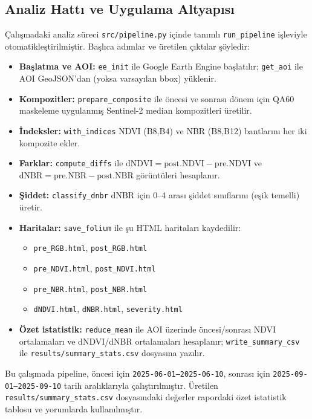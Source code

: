 \documentclass[11pt,a4paper]{article}
\begin{document}
\subsection{Analiz Hattı ve Uygulama Altyapısı}
Çalışmadaki analiz süreci \texttt{src/pipeline.py} içinde tanımlı \texttt{run\_pipeline} işleviyle otomatikleştirilmiştir. Başlıca adımlar ve üretilen çıktılar şöyledir:
\begin{itemize}
  \item \textbf{Başlatma ve AOI:} \texttt{ee\_init} ile Google Earth Engine başlatılır; \texttt{get\_aoi} ile AOI GeoJSON'dan (yoksa varsayılan bbox) yüklenir.
  \item \textbf{Kompozitler:} \texttt{prepare\_composite} ile öncesi ve sonrası dönem için QA60 maskeleme uygulanmış Sentinel-2 median kompozitleri üretilir.
  \item \textbf{İndeksler:} \texttt{with\_indices} NDVI (B8,B4) ve NBR (B8,B12) bantlarını her iki kompozite ekler.
  \item \textbf{Farklar:} \texttt{compute\_diffs} ile $\mathrm{dNDVI} = \mathrm{post.NDVI} - \mathrm{pre.NDVI}$ ve $\mathrm{dNBR} = \mathrm{pre.NBR} - \mathrm{post.NBR}$ görüntüleri hesaplanır.
  \item \textbf{Şiddet:} \texttt{classify\_dnbr} dNBR için 0–4 arası şiddet sınıflarını (eşik temelli) üretir.
  \item \textbf{Haritalar:} \texttt{save\_folium} ile şu HTML haritaları kaydedilir:
  \begin{itemize}
    \item \texttt{pre\_RGB.html}, \texttt{post\_RGB.html}
    \item \texttt{pre\_NDVI.html}, \texttt{post\_NDVI.html}
    \item \texttt{pre\_NBR.html}, \texttt{post\_NBR.html}
    \item \texttt{dNDVI.html}, \texttt{dNBR.html}, \texttt{severity.html}
  \end{itemize}
  \item \textbf{Özet istatistik:} \texttt{reduce\_mean} ile AOI üzerinde öncesi/sonrası NDVI ortalamaları ve dNDVI/dNBR ortalamaları hesaplanır; \texttt{write\_summary\_csv} ile \texttt{results/summary\_stats.csv} dosyasına yazılır.
\end{itemize}

Bu çalışmada pipeline, öncesi için \texttt{2025-06-01--2025-06-10}, sonrası için \texttt{2025-09-01--2025-09-10} tarih aralıklarıyla çalıştırılmıştır. Üretilen \texttt{results/summary\_stats.csv} dosyasındaki değerler rapordaki özet istatistik tablosu ve yorumlarda kullanılmıştır.
\end{document}
